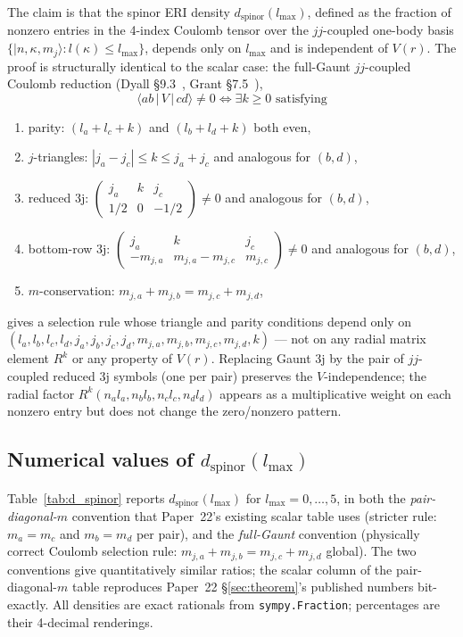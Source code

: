 The claim is that the spinor ERI density
$d_{\mathrm{spinor}}(l_{\max})$, defined as the fraction of nonzero
entries in the 4-index Coulomb tensor over the $jj$-coupled
one-body basis $\{|n, \kappa, m_j\rangle : l(\kappa) \leq l_{\max}\}$,
depends only on $l_{\max}$ and is independent of $V(r)$.
The proof is structurally identical to the scalar case: the full-Gaunt
$jj$-coupled Coulomb reduction
(Dyall \S 9.3~\cite{Dyall}, Grant \S 7.5~\cite{Grant}),
\[
  \langle a b \,|\, V \,|\, c d \rangle \neq 0
  \iff \exists k \geq 0 \text{ satisfying}
\]
\begin{enumerate}
  \item parity: $(l_a + l_c + k)$ and $(l_b + l_d + k)$ both even,
  \item $j$-triangles: $|j_a - j_c| \leq k \leq j_a + j_c$ and analogous for $(b, d)$,
  \item reduced 3j: $\left(\begin{smallmatrix} j_a & k & j_c \\ 1/2 & 0 & -1/2\end{smallmatrix}\right) \neq 0$ and analogous for $(b, d)$,
  \item bottom-row 3j: $\left(\begin{smallmatrix} j_a & k & j_c \\ -m_{j,a} & m_{j,a} - m_{j,c} & m_{j,c}\end{smallmatrix}\right) \neq 0$ and analogous for $(b, d)$,
  \item $m$-conservation: $m_{j,a} + m_{j,b} = m_{j,c} + m_{j,d}$,
\end{enumerate}
gives a selection rule whose triangle and parity conditions depend
only on $(l_a, l_b, l_c, l_d, j_a, j_b, j_c, j_d, m_{j,a}, m_{j,b}, m_{j,c}, m_{j,d}, k)$
--- not on any radial matrix element $R^k$ or any property of $V(r)$.
Replacing Gaunt 3j by the pair of $jj$-coupled reduced 3j symbols
(one per pair) preserves the $V$-independence; the radial factor
$R^k(n_a l_a, n_b l_b, n_c l_c, n_d l_d)$ appears as a
multiplicative weight on each nonzero entry but does not change the
zero/nonzero pattern.

\subsection{Numerical values of $d_{\mathrm{spinor}}(l_{\max})$}

Table~\ref{tab:d_spinor} reports $d_{\mathrm{spinor}}(l_{\max})$ for
$l_{\max} = 0, \dots, 5$, in both the \emph{pair-diagonal-$m$}
convention that Paper~22's existing scalar table uses (stricter rule:
$m_a = m_c$ and $m_b = m_d$ per pair), and the \emph{full-Gaunt}
convention (physically correct Coulomb selection rule:
$m_{j,a} + m_{j,b} = m_{j,c} + m_{j,d}$ global). The two conventions
give quantitatively similar ratios; the scalar column of the
pair-diagonal-$m$ table reproduces Paper~22 \S\ref{sec:theorem}'s
published numbers bit-exactly. All densities are exact rationals
from \texttt{sympy.Fraction}; percentages are their 4-decimal
renderings.

